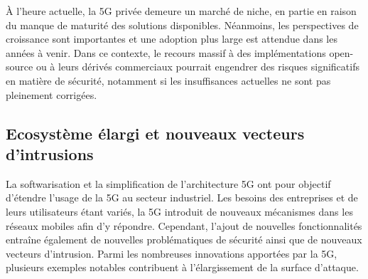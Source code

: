 \documentclass[a4paper,11pt,twoside]{StyleThese}
\begin{document}
À l’heure actuelle, la 5G privée demeure un marché de niche, en partie en raison du manque de maturité des solutions disponibles. Néanmoins, les perspectives de croissance sont importantes et une adoption plus large est attendue dans les années à venir. Dans ce contexte, le recours massif à des implémentations open-source ou à leurs dérivés commerciaux pourrait engendrer des risques significatifs en matière de sécurité, notamment si les insuffisances actuelles ne sont pas pleinement corrigées.

\subsection{Ecosystème élargi et nouveaux vecteurs d'intrusions}
La softwarisation et la simplification de l’architecture 5G ont pour objectif d’étendre l’usage de la 5G au secteur industriel. Les besoins des entreprises et de leurs utilisateurs étant variés, la 5G introduit de nouveaux mécanismes dans les réseaux mobiles afin d’y répondre. Cependant, l’ajout de nouvelles fonctionnalités entraîne également de nouvelles problématiques de sécurité ainsi que de nouveaux vecteurs d’intrusion. Parmi les nombreuses innovations apportées par la 5G, plusieurs exemples notables contribuent à l’élargissement de la surface d’attaque.
\end{document}
